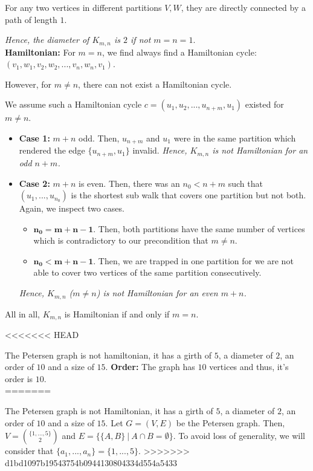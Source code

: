 \documentclass[a4paper]{article}
\begin{document}
\begin{solution}{9}
\begin{theorem}
				For any two vertices in different partitions $V, W$, they are directly connected by a path of length $1$.

				 \emph{Hence, the diameter of $K_{m,n}$ is $2$ if not $m = n = 1$}.\\

			\textbf{Hamiltonian:} For $m = n$, we find always find a Hamiltonian cycle: $(v_1, w_1, v_2, w_2, ..., v_n, w_n, v_1)$.

				However, for $m \neq n$, there can not exist a Hamiltonian cycle.

				We assume such a Hamiltonian cycle $c = (u_1, u_2, ..., u_{n+m}, u_1)$ existed for $m \neq n$. 
				\begin{itemize}
					\item \textbf{Case 1:} $m + n$ odd. Then, $u_{n+m}$ and $u_1$ were in the same partition which rendered the edge $\{u_{n+m}, u_1\}$ invalid. \emph{Hence, $K_{m,n}$ is not Hamiltonian for an odd $n + m$.}
					\item \textbf{Case 2:} $m + n$ is even. Then, there was an $n_0 < n+m$ such that $(u_1, ..., u_{n_0})$ is the shortest sub walk that covers one partition but not both. Again, we inspect two cases.
						\begin{itemize}
							\item $\mathbf{n_0 = m + n - 1}$. Then, both partitions have the same number of vertices which is contradictory to our precondition that $m \neq n$.
							\item $\mathbf{n_0 < m + n - 1}$. Then, we are trapped in one partition for we are not able to cover two vertices of the same partition consecutively.
						\end{itemize}
					\emph{Hence, $K_{m, n}$ ($m \neq n$) is not Hamiltonian for an even $m + n$.}
				\end{itemize}

				All in all, $K_{m,n}$ is Hamiltonian if and only if $m = n$.
		\end{theorem}
			
		\newpage

<<<<<<< HEAD
		\begin{theorem}{The Petersen graph is not hamiltonian, it has a girth of $5$, a diameter of $2$, an order of $10$ and a size of $15$.}
			\textbf{Order:} The graph has $10$ vertices and thus, it's order is $10$.\\
=======
		\begin{theorem}{The Petersen graph is not Hamiltonian, it has a girth of $5$, a diameter of $2$, an order of $10$ and a size of $15$.}
			Let $G = (V, E)$ be the Petersen graph. Then, $V = \binom{\{1, ..., 5\}}{2}$ and $E = \{\{A, B\}\ |\ A \cap B = \emptyset\}$. To avoid loss of generality, we will consider that $\{a_1, ..., a_n\} = \{1, ..., 5\}$.
>>>>>>> d1bd1097b19543754b0944130804334d554a5433
			

\end{theorem}
\end{theorem}
\end{solution}
\end{document}
